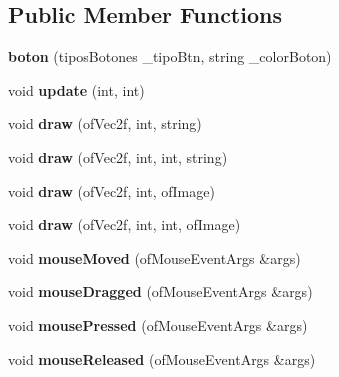 \subsection*{Public Member Functions}
\begin{DoxyCompactItemize}
\item 
\hypertarget{classboton_a3372383d8b639a7f900ffad42a81f575}{}{\bfseries boton} (tipos\+Botones \+\_\+tipo\+Btn, string \+\_\+color\+Boton)\label{classboton_a3372383d8b639a7f900ffad42a81f575}

\item 
\hypertarget{classboton_a358ea773863186635746810589c3d275}{}void {\bfseries update} (int, int)\label{classboton_a358ea773863186635746810589c3d275}

\item 
\hypertarget{classboton_a564fb8db709acbb55fa8dbd6fee7ff8a}{}void {\bfseries draw} (of\+Vec2f, int, string)\label{classboton_a564fb8db709acbb55fa8dbd6fee7ff8a}

\item 
\hypertarget{classboton_a02b7a19feae6df824d68f134fce6dab0}{}void {\bfseries draw} (of\+Vec2f, int, int, string)\label{classboton_a02b7a19feae6df824d68f134fce6dab0}

\item 
\hypertarget{classboton_a297b08b9c3935c4cd55628c7bbdc5876}{}void {\bfseries draw} (of\+Vec2f, int, of\+Image)\label{classboton_a297b08b9c3935c4cd55628c7bbdc5876}

\item 
\hypertarget{classboton_a5b5786e0e80df5c94c04e607e16920e7}{}void {\bfseries draw} (of\+Vec2f, int, int, of\+Image)\label{classboton_a5b5786e0e80df5c94c04e607e16920e7}

\item 
\hypertarget{classboton_ab7d750781870e9c71f3fdfd8da457c06}{}void {\bfseries mouse\+Moved} (of\+Mouse\+Event\+Args \&args)\label{classboton_ab7d750781870e9c71f3fdfd8da457c06}

\item 
\hypertarget{classboton_ac9791d558f667d015e0e3913b6162a66}{}void {\bfseries mouse\+Dragged} (of\+Mouse\+Event\+Args \&args)\label{classboton_ac9791d558f667d015e0e3913b6162a66}

\item 
\hypertarget{classboton_a7ae6e9bfc79c27b6f0727898fb572e60}{}void {\bfseries mouse\+Pressed} (of\+Mouse\+Event\+Args \&args)\label{classboton_a7ae6e9bfc79c27b6f0727898fb572e60}

\item 
\hypertarget{classboton_a453f2c190a1f4d8a39d7ada30d78f8fd}{}void {\bfseries mouse\+Released} (of\+Mouse\+Event\+Args \&args)\label{classboton_a453f2c190a1f4d8a39d7ada30d78f8fd}


\end{DoxyCompactItemize}
